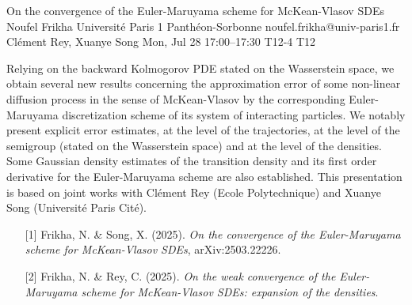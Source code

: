 \begin{talk}
  {On the convergence of the Euler-Maruyama scheme for McKean-Vlasov SDEs}%
  {Noufel Frikha}%
  {Universit\'e Paris 1 Panth\'eon-Sorbonne}%
  {noufel.frikha@univ-paris1.fr}%
  {Cl\'ement Rey, Xuanye Song}%
  {}%
  {Mon, Jul 28 17:00–17:30}%
  {T12-4}%
  {T12}%
  
				
			
Relying on the backward Kolmogorov PDE stated on the Wasserstein space, we obtain several new results concerning the approximation error of some non-linear diffusion process in the sense of McKean-Vlasov by the corresponding Euler-Maruyama discretization scheme of its system of interacting particles. We notably present explicit error estimates, at the level of the trajectories, at the level of the semigroup (stated on the Wasserstein space) and at the level of the densities. Some Gaussian density estimates of the transition density and its first order derivative for the Euler-Maruyama scheme are also established. This presentation is based on joint works with Cl\'ement Rey (Ecole Polytechnique) and Xuanye Song (Universit\'e Paris Cit\'e).

\medskip


\begin{enumerate}
	\item[{[1]}] Frikha, N.  \& Song, X. (2025). {\it On the convergence of the Euler-Maruyama scheme for McKean-Vlasov SDEs}, arXiv:2503.22226.
	\item[{[2]}] Frikha, N. \& Rey, C. (2025).  {\it On the weak convergence of the Euler-Maruyama scheme for McKean-Vlasov SDEs: expansion of the densities}.
\end{enumerate}


\end{talk}

